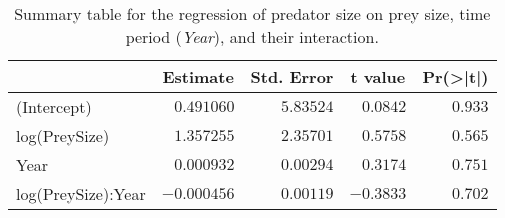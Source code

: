 \begin{table}[!htbp]
\caption{Summary table for the regression of predator 
  size on prey size,
  time period (\textit{Year}), 
  and their interaction.\label{tab:SizeYint}} 
\begin{center}
\begin{tabular}{lrrrr}
\hline
\multicolumn{1}{l}{}&\multicolumn{1}{c}{Estimate}&\multicolumn{1}{c}{Std. Error}&\multicolumn{1}{c}{t value}&\multicolumn{1}{c}{Pr(\textgreater |t|)}\tabularnewline
\hline
(Intercept)&$ 0.491060$&$5.83524$&$ 0.0842$&$0.933$\tabularnewline
log(PreySize)&$ 1.357255$&$2.35701$&$ 0.5758$&$0.565$\tabularnewline
Year&$ 0.000932$&$0.00294$&$ 0.3174$&$0.751$\tabularnewline
log(PreySize):Year&$-0.000456$&$0.00119$&$-0.3833$&$0.702$\tabularnewline
\hline
\end{tabular}\end{center}
\end{table}
